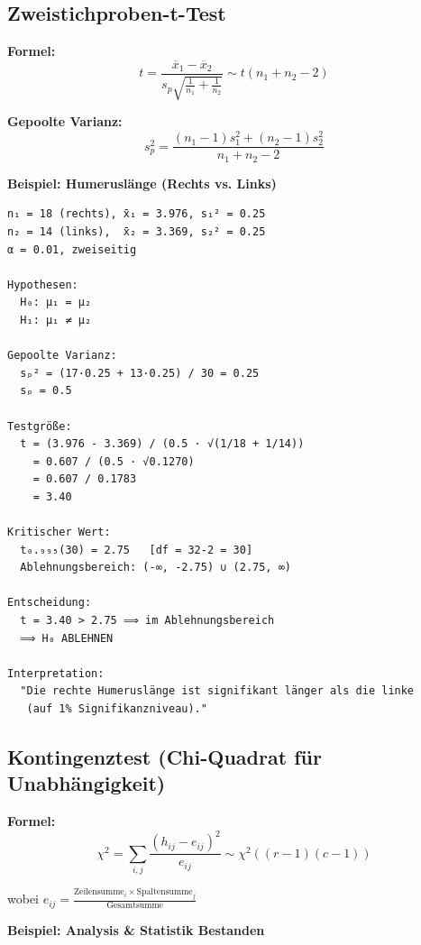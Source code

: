 \documentclass[12pt, a4paper, ngerman]{scrartcl}
\begin{document}
\subsection{Zweistichproben-t-Test}

\textbf{Formel:}
$$t = \frac{\overline{x}_1 - \overline{x}_2}{s_p \sqrt{\frac{1}{n_1} + \frac{1}{n_2}}} \sim t(n_1 + n_2 - 2)$$

\textbf{Gepoolte Varianz:}
$$s_p^2 = \frac{(n_1-1)s_1^2 + (n_2-1)s_2^2}{n_1 + n_2 - 2}$$

\textbf{Beispiel: Humeruslänge (Rechts vs. Links)}

\begin{verbatim}
n₁ = 18 (rechts), x̄₁ = 3.976, s₁² = 0.25
n₂ = 14 (links),  x̄₂ = 3.369, s₂² = 0.25
α = 0.01, zweiseitig

Hypothesen:
  H₀: μ₁ = μ₂
  H₁: μ₁ ≠ μ₂

Gepoolte Varianz:
  sₚ² = (17·0.25 + 13·0.25) / 30 = 0.25
  sₚ = 0.5

Testgröße:
  t = (3.976 - 3.369) / (0.5 · √(1/18 + 1/14))
    = 0.607 / (0.5 · √0.1270)
    = 0.607 / 0.1783
    = 3.40

Kritischer Wert:
  t₀.₉₉₅(30) = 2.75   [df = 32-2 = 30]
  Ablehnungsbereich: (-∞, -2.75) ∪ (2.75, ∞)

Entscheidung:
  t = 3.40 > 2.75 ⟹ im Ablehnungsbereich
  ⟹ H₀ ABLEHNEN

Interpretation:
  "Die rechte Humeruslänge ist signifikant länger als die linke
   (auf 1% Signifikanzniveau)."
\end{verbatim}

\subsection{Kontingenztest (Chi-Quadrat für Unabhängigkeit)}

\textbf{Formel:}
$$\chi^2 = \sum_{i,j} \frac{(h_{ij} - e_{ij})^2}{e_{ij}} \sim \chi^2((r-1)(c-1))$$

wobei $e_{ij} = \frac{\text{Zeilensumme}_i \times \text{Spaltensumme}_j}{\text{Gesamtsumme}}$

\textbf{Beispiel: Analysis \& Statistik Bestanden}
\end{document}
